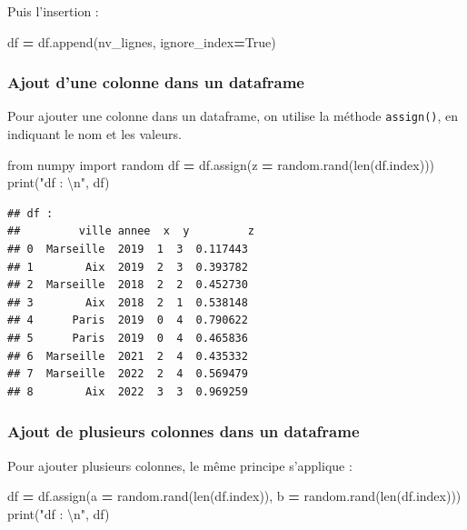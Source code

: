 \documentclass[12pt,]{book}
\newenvironment{Shaded}{\begin{snugshade}}{\end{snugshade}}
\newcommand{\CharTok}[1]{\textcolor[rgb]{0.31,0.60,0.02}{#1}}
\newcommand{\StringTok}[1]{\textcolor[rgb]{0.31,0.60,0.02}{#1}}
\newcommand{\ImportTok}[1]{#1}
\newcommand{\VariableTok}[1]{\textcolor[rgb]{0.00,0.00,0.00}{#1}}
\newcommand{\OperatorTok}[1]{\textcolor[rgb]{0.81,0.36,0.00}{\textbf{#1}}}
\newcommand{\BuiltInTok}[1]{#1}
\newcommand{\NormalTok}[1]{#1}
\numberwithin{equation}{section}
\numberwithin{countremarque}{section}
\begin{document}
Puis l'insertion :

\begin{Shaded}
\begin{Highlighting}[]
\NormalTok{df }\OperatorTok{=}\NormalTok{ df.append(nv_lignes, ignore_index}\OperatorTok{=}\VariableTok{True}\NormalTok{)}
\end{Highlighting}
\end{Shaded}

\subsubsection{Ajout d'une colonne dans un
dataframe}\label{ajout-dune-colonne-dans-un-dataframe}

Pour ajouter une colonne dans un dataframe, on utilise la méthode
\texttt{assign()}, en indiquant le nom et les valeurs.

\begin{Shaded}
\begin{Highlighting}[]
\ImportTok{from}\NormalTok{ numpy }\ImportTok{import}\NormalTok{ random}
\NormalTok{df }\OperatorTok{=}\NormalTok{ df.assign(z }\OperatorTok{=}\NormalTok{ random.rand(}\BuiltInTok{len}\NormalTok{(df.index)))}
\BuiltInTok{print}\NormalTok{(}\StringTok{"df : }\CharTok{\textbackslash{}n}\StringTok{"}\NormalTok{, df)}
\end{Highlighting}
\end{Shaded}

\begin{lstlisting}
## df : 
##         ville annee  x  y         z
## 0  Marseille  2019  1  3  0.117443
## 1        Aix  2019  2  3  0.393782
## 2  Marseille  2018  2  2  0.452730
## 3        Aix  2018  2  1  0.538148
## 4      Paris  2019  0  4  0.790622
## 5      Paris  2019  0  4  0.465836
## 6  Marseille  2021  2  4  0.435332
## 7  Marseille  2022  2  4  0.569479
## 8        Aix  2022  3  3  0.969259
\end{lstlisting}

\subsubsection{Ajout de plusieurs colonnes dans un
dataframe}\label{ajout-de-plusieurs-colonnes-dans-un-dataframe}

Pour ajouter plusieurs colonnes, le même principe s'applique :

\begin{Shaded}
\begin{Highlighting}[]
\NormalTok{df }\OperatorTok{=}\NormalTok{ df.assign(a }\OperatorTok{=}\NormalTok{ random.rand(}\BuiltInTok{len}\NormalTok{(df.index)),}
\NormalTok{          b }\OperatorTok{=}\NormalTok{ random.rand(}\BuiltInTok{len}\NormalTok{(df.index)))}
\BuiltInTok{print}\NormalTok{(}\StringTok{"df : }\CharTok{\textbackslash{}n}\StringTok{"}\NormalTok{, df)}
\end{Highlighting}
\end{Shaded}
\end{document}
